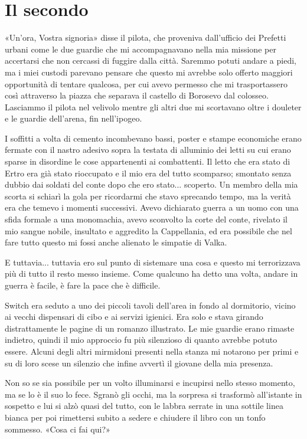 \chapter{Il secondo}

«Un'ora, Vostra signoria» disse il pilota, che proveniva dall'ufficio
dei Prefetti urbani come le due guardie che mi accompagnavano nella mia
missione per accertarsi che non cercassi di fuggire dalla città. Saremmo
potuti andare a piedi, ma i miei custodi parevano pensare che questo mi
avrebbe solo offerto maggiori opportunità di tentare qualcosa, per cui
avevo permesso che mi trasportassero così attraverso la piazza che
separava il castello di Borosevo dal colosseo. Lasciammo il pilota nel
velivolo mentre gli altri due mi scortavano oltre i douleter e le
guardie dell'arena, fin nell'ipogeo.

I soffitti a volta di cemento incombevano bassi, poster e stampe
economiche erano fermate con il nastro adesivo sopra la testata di
alluminio dei letti su cui erano sparse in disordine le cose
appartenenti ai combattenti. Il letto che era stato di Ertro era già
stato rioccupato e il mio era del tutto scomparso; smontato senza dubbio
dai soldati del conte dopo che ero stato... scoperto. Un membro della
mia scorta si schiarì la gola per ricordarmi che stavo sprecando tempo,
ma la verità era che temevo i momenti successivi. Avevo dichiarato
guerra a un uomo con una sfida formale a una monomachia, avevo sconvolto
la corte del conte, rivelato il mio sangue nobile, insultato e aggredito
la Cappellania, ed era possibile che nel fare tutto questo mi fossi
anche alienato le simpatie di Valka.

E tuttavia... tuttavia ero sul punto di sistemare una cosa e questo mi
terrorizzava più di tutto il resto messo insieme. Come qualcuno ha detto
una volta, andare in guerra è facile, è fare la pace che è difficile.

Switch era seduto a uno dei piccoli tavoli dell'area in fondo al
dormitorio, vicino ai vecchi dispensari di cibo e ai servizi igienici.
Era solo e stava girando distrattamente le pagine di un romanzo
illustrato. Le mie guardie erano rimaste indietro, quindi il mio
approccio fu più silenzioso di quanto avrebbe potuto essere. Alcuni
degli altri mirmidoni presenti nella stanza mi notarono per primi e su
di loro scese un silenzio che infine avvertì il giovane della mia
presenza.

Non so se sia possibile per un volto illuminarsi e incupirsi nello
stesso momento, ma se lo è il suo lo fece. Sgranò gli occhi, ma la
sorpresa si trasformò all'istante in sospetto e lui si alzò quasi del
tutto, con le labbra serrate in una sottile linea bianca per poi
rimettersi subito a sedere e chiudere il libro con un tonfo sommesso.
«Cosa ci fai qui?»

